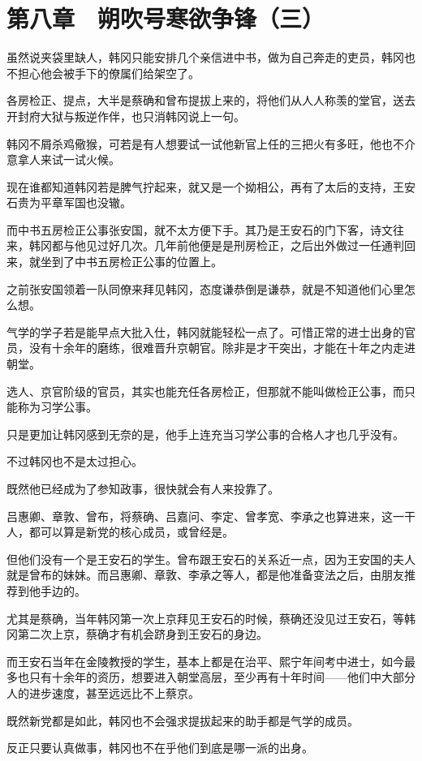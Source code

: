\section{第八章　朔吹号寒欲争锋（三）}

虽然说夹袋里缺人，韩冈只能安排几个亲信进中书，做为自己奔走的吏员，韩冈也不担心他会被手下的僚属们给架空了。

各房检正、提点，大半是蔡确和曾布提拔上来的，将他们从人人称羡的堂官，送去开封府大狱与叛逆作伴，也只消韩冈说上一句。

韩冈不屑杀鸡儆猴，可若是有人想要试一试他新官上任的三把火有多旺，他也不介意拿人来试一试火候。

现在谁都知道韩冈若是脾气拧起来，就又是一个拗相公，再有了太后的支持，王安石贵为平章军国也没辙。

而中书五房检正公事张安国，就不太方便下手。其乃是王安石的门下客，诗文往来，韩冈都与他见过好几次。几年前他便是是刑房检正，之后出外做过一任通判回来，就坐到了中书五房检正公事的位置上。

之前张安国领着一队同僚来拜见韩冈，态度谦恭倒是谦恭，就是不知道他们心里怎么想。

气学的学子若是能早点大批入仕，韩冈就能轻松一点了。可惜正常的进士出身的官员，没有十余年的磨练，很难晋升京朝官。除非是才干突出，才能在十年之内走进朝堂。

选人、京官阶级的官员，其实也能充任各房检正，但那就不能叫做检正公事，而只能称为习学公事。

只是更加让韩冈感到无奈的是，他手上连充当习学公事的合格人才也几乎没有。

不过韩冈也不是太过担心。

既然他已经成为了参知政事，很快就会有人来投靠了。

吕惠卿、章敦、曾布，将蔡确、吕嘉问、李定、曾孝宽、李承之也算进来，这一干人，都可以算是新党的核心成员，或曾经是。

但他们没有一个是王安石的学生。曾布跟王安石的关系近一点，因为王安国的夫人就是曾布的妹妹。而吕惠卿、章敦、李承之等人，都是他准备变法之后，由朋友推荐到他手边的。

尤其是蔡确，当年韩冈第一次上京拜见王安石的时候，蔡确还没见过王安石，等韩冈第二次上京，蔡确才有机会跻身到王安石的身边。

而王安石当年在金陵教授的学生，基本上都是在治平、熙宁年间考中进士，如今最多也只有十余年的资历，想要进入朝堂高层，至少再有十年时间——他们中大部分人的进步速度，甚至远远比不上蔡京。

既然新党都是如此，韩冈也不会强求提拔起来的助手都是气学的成员。

反正只要认真做事，韩冈也不在乎他们到底是哪一派的出身。

